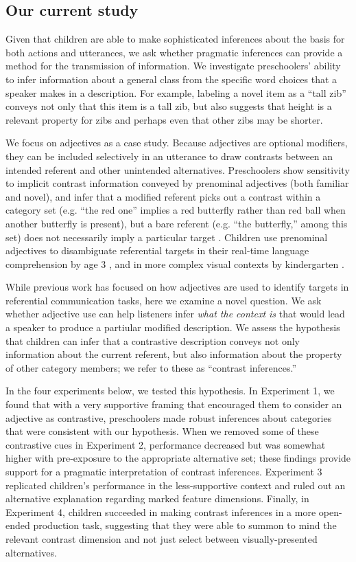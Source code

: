 \documentclass[man]{apa2}
\begin{document}
\subsection{Our current study}

Given that children are able to make sophisticated inferences about the basis for both actions and utterances, we ask whether pragmatic inferences can provide a method for the transmission of information. We investigate preschoolers' ability to infer information about a general class from the specific word choices that a speaker makes in a description. For example, labeling a novel item as a ``tall zib'' conveys not only that this item is a tall zib, but also suggests that height is a relevant property for zibs and perhaps even that other zibs may be shorter.   

We focus on adjectives as a case study.  Because adjectives are optional modifiers, they can be included selectively in an utterance to draw contrasts between an intended referent and other unintended alternatives. Preschoolers show sensitivity to implicit contrast information conveyed by prenominal adjectives (both familiar and novel), and infer that a modified referent picks out a contrast within a category set (e.g. ``the red one'' implies a red butterfly rather than red ball when another butterfly is present), but a bare referent (e.g. ``the butterfly,'' among this set) does not necessarily imply a particular target \cite{gelman1985}. Children use prenominal adjectives to disambiguate referential targets in their real-time language comprehension by age 3 \cite{fernald2010}, and in more complex visual contexts by kindergarten \cite{nadig2002}. 

While previous work has focused on how adjectives are used to identify targets in referential communication tasks, here we examine a novel question. We ask whether adjective use can help listeners infer \emph{what the context is} that would lead a speaker to produce a partiular modified description. We assess the hypothesis that children can infer that a contrastive description conveys not only information about the current referent, but also information about the property of other category members; we refer to these as ``contrast inferences.'' 

In the four experiments below, we tested this hypothesis. In Experiment 1, we found that with a very supportive framing that encouraged them to consider an adjective as contrastive, preschoolers made robust inferences about categories that were consistent with our hypothesis. When we removed some of these contrastive cues in Experiment 2, performance decreased but was somewhat higher with pre-exposure to the appropriate alternative set; these findings provide support for a pragmatic interpretation of contrast inferences. Experiment 3 replicated children's performance in the less-supportive context and ruled out an alternative explanation regarding marked feature dimensions. Finally, in Experiment 4, children succeeded in making contrast inferences in a more open-ended production task, suggesting that they were able to summon to mind the relevant contrast dimension and not just select between visually-presented alternatives. 
\end{document}
